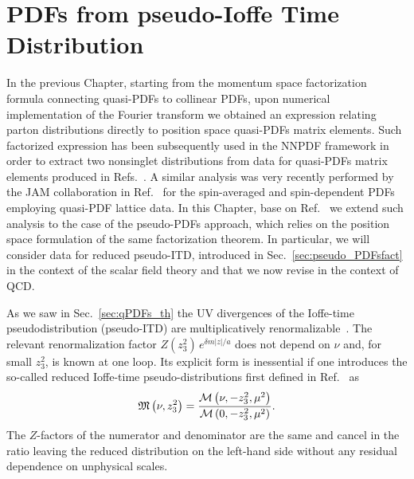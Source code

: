 \chapter{PDFs from pseudo-Ioffe Time Distribution}
\label{ch:ppdf_NNPDF}
In the previous Chapter, 
starting from the momentum space factorization formula connecting quasi-PDFs to collinear PDFs,
upon numerical implementation of the Fourier transform we obtained an expression relating
parton distributions directly to position space quasi-PDFs matrix elements.
Such factorized expression has been subsequently used in the NNPDF framework in order to 
extract two nonsinglet distributions from data for quasi-PDFs matrix elements 
produced in Refs.~\cite{Alexandrou:2018pbm, Alexandrou:2019lfo}.
A similar analysis was very recently performed by the JAM collaboration in Ref.~\cite{Bringewatt:2020ixn} 
for the spin-averaged and spin-dependent PDFs employing quasi-PDF lattice data.  
In this Chapter, base on Ref.~\cite{DelDebbio:2020rgv} we extend such analysis to the case of the pseudo-PDFs approach,
which relies on the position space formulation of the same factorization theorem. 
In particular, we will consider data for reduced pseudo-ITD, introduced in Sec.~\ref{sec:pseudo_PDFsfact}
in the context of the scalar field theory and that we now revise in the context of QCD.

%
As we saw in Sec.~\ref{sec:qPDFs_th} the UV divergences of the Ioffe-time pseudodistribution (pseudo-ITD)
are multiplicatively renormalizable~\cite{Ji:2017oey,Ishikawa:2017faj}. 
The relevant renormalization factor $Z(z_3^2)\,e^{\delta m |z|/a}$ does not depend on $\nu$ and, 
for small $z_3^2$,   is known at one loop. 
Its explicit form is inessential if one introduces the so-called reduced 
Ioffe-time pseudo-distributions first defined in Ref.~\cite{Radyushkin:2017cyf}
as 
\begin{align}
	\label{eq:reducedIoffe}
	\mathfrak{M}\left(\nu, z_3^2\right) = \frac{\mathcal{M}\left( \nu,-z_3^2, \mu^2 \right)}{\mathcal{M}\left( 0,-z_3^2, \mu^2 \right)}. 
\end{align}
The $Z$-factors of the numerator and denominator are the same and cancel in the ratio leaving the reduced distribution
on the left-hand side without any residual dependence on 
unphysical scales. 


